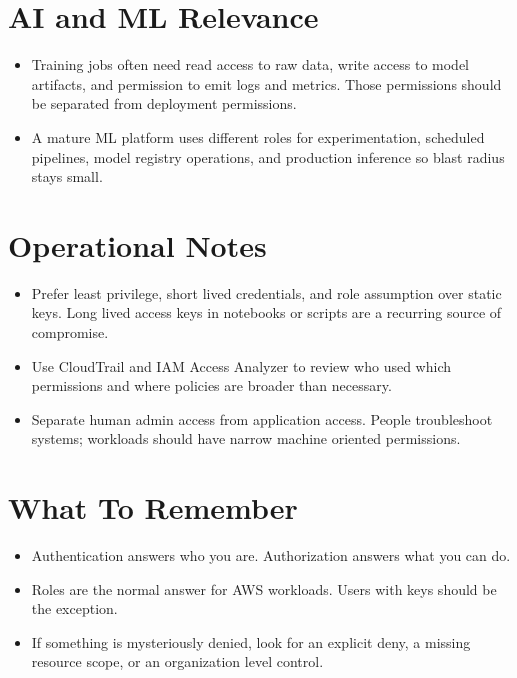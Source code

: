 \documentclass[10pt,twocolumn]{article}
\begin{document}
\section*{AI and ML Relevance}
\begin{itemize}
\item Training jobs often need read access to raw data, write access to model artifacts, and permission to emit logs and metrics. Those permissions should be separated from deployment permissions.
\item A mature ML platform uses different roles for experimentation, scheduled pipelines, model registry operations, and production inference so blast radius stays small.
\end{itemize}

\section*{Operational Notes}
\begin{itemize}
\item Prefer least privilege, short lived credentials, and role assumption over static keys. Long lived access keys in notebooks or scripts are a recurring source of compromise.
\item Use CloudTrail and IAM Access Analyzer to review who used which permissions and where policies are broader than necessary.
\item Separate human admin access from application access. People troubleshoot systems; workloads should have narrow machine oriented permissions.
\end{itemize}

\section*{What To Remember}
\begin{itemize}
\item Authentication answers who you are. Authorization answers what you can do.
\item Roles are the normal answer for AWS workloads. Users with keys should be the exception.
\item If something is mysteriously denied, look for an explicit deny, a missing resource scope, or an organization level control.
\end{itemize}
\end{document}
